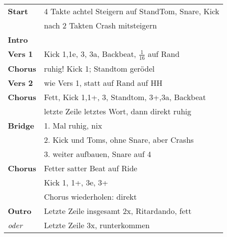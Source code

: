 
\begin{tabular}{p{1.6cm}l}
	\textbf{Start}  & 4 Takte achtel Steigern auf StandTom, Snare, Kick   \\
	                & nach 2 Takten Crash mitsteigern                     \\
	\textbf{Intro}  &                                                     \\
	\textbf{Vers 1} & Kick 1,1e, 3, 3a, Backbeat, $\frac{1}{16}$ auf Rand \\
	\textbf{Chorus} & ruhig! Kick 1; Standtom gerödel                     \\
	\textbf{Vers 2} & wie Vers 1, statt auf Rand auf HH                   \\
	\textbf{Chorus} & Fett, Kick 1,1+, 3, Standtom, 3+,3a, Backbeat       \\
	                & letzte Zeile letztes Wort, dann direkt ruhig        \\
	\textbf{Bridge} & 1. Mal ruhig, nix                                   \\
	                & 2. Kick und Toms, ohne Snare, aber Crashs           \\
	                & 3. weiter aufbauen, Snare auf 4                     \\
	\textbf{Chorus} & Fetter satter Beat auf Ride                         \\
	                & Kick 1, 1+, 3e, 3+                                  \\
	                & Chorus wiederholen: direkt                          \\
	\textbf{Outro}  & Letzte Zeile insgesamt 2x, Ritardando, fett         \\
	\textit{oder}   & Letzte Zeile 3x, runterkommen                       \\
\end{tabular}
